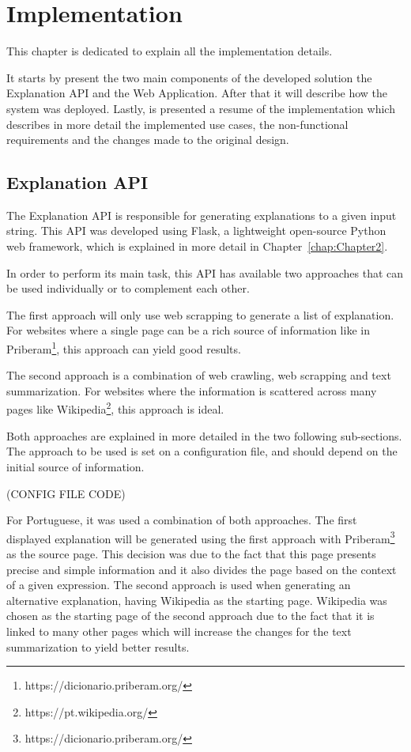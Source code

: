
\chapter{Implementation} %
\label{chap:Chapter5}

This chapter is dedicated to explain all the implementation details.

It starts by present the two main components of the developed solution the Explanation API and the Web Application.
After that it will describe how the system was deployed.
Lastly, is presented a resume of the implementation which describes in more detail the implemented use cases, the non-functional requirements and the changes made to the original design.

\section{Explanation API}

The Explanation API is responsible for generating explanations to a given input string.
This API was developed using Flask, a lightweight open-source Python web framework, which is explained in more detail in Chapter~\ref{chap:Chapter2}.

In order to perform its main task, this API has available two approaches that can be used individually or to complement each other.

The first approach will only use web scrapping to generate a list of explanation.
For websites where a single page can be a rich source of information like in Priberam\footnote{https://dicionario.priberam.org/}, this approach can yield good results.

The second approach is a combination of web crawling, web scrapping and text summarization.
For websites where the information is scattered across many pages like Wikipedia\footnote{https://pt.wikipedia.org/}, this approach is ideal.

Both approaches are explained in more detailed in the two following sub-sections.
The approach to be used is set on a configuration file, and should depend on the initial source of information.

(CONFIG FILE CODE) %

For Portuguese, it was used a combination of both approaches.
The first displayed explanation will be generated using the first approach with Priberam\footnote{https://dicionario.priberam.org/} as the source page.
This decision was due to the fact that this page presents precise and simple information and it also divides the page based on the context of a given expression.
The second approach is used when generating an alternative explanation, having Wikipedia as the starting page.
Wikipedia was chosen as the starting page of the second approach due to the fact that it is linked to many other pages which will increase the changes for the text summarization to yield better results.

